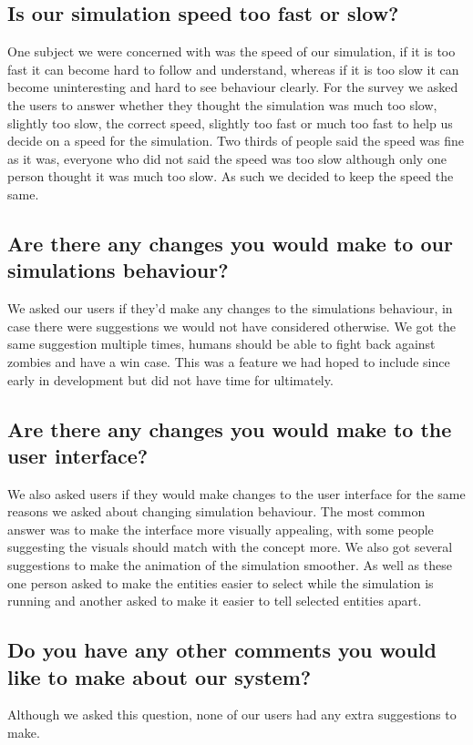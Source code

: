 \subsection{Is our simulation speed too fast or slow?}

One subject we were concerned with was the speed of our simulation, if it is too fast it can become hard to follow and understand, whereas if it is too slow it can become uninteresting and hard to see behaviour clearly. For the survey we asked the users to answer whether they thought  the simulation was much too slow, slightly too slow, the correct speed, slightly too fast or much too fast to help us decide on a speed for the simulation. Two thirds of people said the speed was fine as it was, everyone who did not said the speed was too slow although only one person thought it was much too slow. As such we decided to keep the speed the same.


\subsection{Are there any changes you would make to our simulations behaviour?} 

We asked our users if they'd make any changes to the simulations behaviour, in case there were suggestions we would not have considered otherwise. We got the same suggestion multiple times, humans should be able to fight back against zombies and have a win case.  This was a feature we had hoped to include since early in development but did not have time for ultimately.

\subsection{Are there any changes you would make to the user interface?}

We also asked users if they would make changes to the user interface for the same reasons we asked about changing simulation behaviour. The most common answer was to make the interface more visually appealing, with some people suggesting the visuals should match with the concept more.
We also got several suggestions to make the animation of the simulation smoother. As well as these one person asked to make the entities easier to select while the simulation is running and another asked to make it easier to tell selected entities apart.

\subsection{Do you have any other comments you would like to make about our system?}

Although we asked this question, none of our users had any extra suggestions to make.

\clearpage
\endinput
